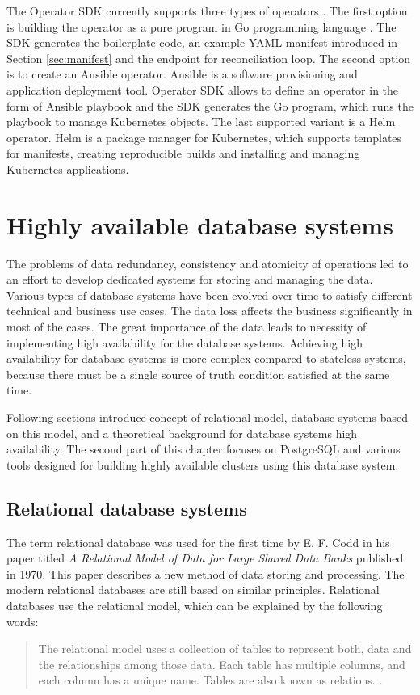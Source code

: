 \documentclass[
  digital, %
  twoside, %
  table,   %
  lof,     %
  lot,     %
]{fithesis3}
\begin{document}
The Operator SDK currently supports three types of operators \cite{operatorhub-sdk}. The first option is building the operator as a pure program in Go programming language \cite{golang}. The SDK generates the boilerplate code, an example YAML manifest introduced in Section \ref{sec:manifest} and the endpoint for reconciliation loop. The second option is to create an Ansible operator. Ansible \cite{ansible} is a software provisioning and application deployment tool. Operator SDK allows to define an operator in the form of Ansible playbook \cite{wwp} and the SDK generates the Go program, which runs the playbook to manage Kubernetes objects. The last supported variant is a Helm operator. Helm \cite{helm} is a package manager for Kubernetes, which supports templates for manifests, creating reproducible builds and installing and managing Kubernetes applications.


\chapter{Highly available database systems} \label{chap:ha_database_systems}
The problems of data redundancy, consistency and atomicity of operations led to an effort to develop dedicated systems for storing and managing the data. Various types of database systems have been evolved over time to satisfy different technical and business use cases. The data loss affects the business significantly in most of the cases. The great importance of the data leads to necessity of implementing high availability for the database systems. Achieving high availability for database systems is more complex compared to stateless systems, because there must be a single source of truth condition satisfied at the same time.

Following sections introduce concept of relational model, database systems based on this model, and a theoretical background for database systems high availability. The second part of this chapter focuses on PostgreSQL and various tools designed for building highly available clusters using this database system.

\section{Relational database systems}
The term relational database was used for the first time by E. F. Codd in his paper titled \textit{A Relational Model of Data for Large Shared Data Banks} \cite{codd_relational_model} published in 1970. This paper describes a new method of data storing and processing. The modern relational databases are still based on similar principles. Relational databases use the relational model, which can be explained by the following words:
\begin{quote}
The relational model uses a collection of tables to represent both, data and the relationships among those data. Each table has multiple columns, and each column has a unique name. Tables are also known as relations. \cite[p. 9]{db}.
\end{quote}
\end{document}
